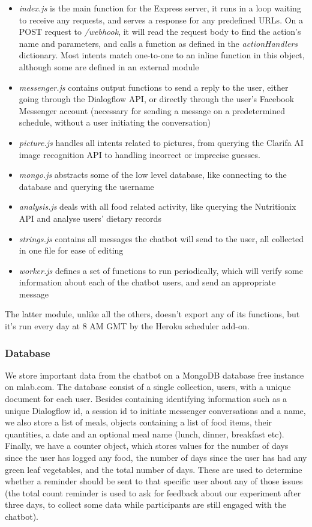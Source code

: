 \begin{itemize}
  \item \textit{index.js} is the main function for the Express server, it runs in a loop waiting to receive any requests, and serves a response for any predefined URLs. On a POST request to \textit{/webhook}, it will read the request body to find the action's name and parameters, and calls a function as defined in the \textit{actionHandlers} dictionary. Most intents match one-to-one to an inline function in this object, although some are defined in an external module
  \item \textit{messenger.js} contains output functions to send a reply to the user, either going through the Dialogflow API, or directly through the user's Facebook Messenger account (necessary for sending a message on a predetermined schedule, without a user initiating the conversation)
  \item \textit{picture.js} handles all intents related to pictures, from querying the Clarifa AI image recognition API to handling incorrect or imprecise guesses.
  \item \textit{mongo.js} abstracts some of the low level database, like connecting to the database and querying the username
  \item \textit{analysis.js} deals with all food related activity, like querying the Nutritionix API and analyse users' dietary records
  \item \textit{strings.js} contains all messages the chatbot will send to the user, all collected in one file for ease of editing
  \item \textit{worker.js} defines a set of functions to run periodically, which will verify some information about each of the chatbot users, and send an appropriate message
\end{itemize}
The latter module, unlike all the others, doesn't export any of its functions, but it's run every day at 8 AM GMT by the Heroku scheduler add-on.
\subsubsection{Database}
We store important data from the chatbot on a MongoDB database free instance on mlab.com. The database consist of a single collection, users, with a unique document for each user. Besides containing identifying information such as a unique Dialogflow id, a session id to initiate messenger conversations and a name, we also store a list of meals, objects containing a list of food items, their quantities, a date and an optional meal name (lunch, dinner, breakfast etc). Finally, we have a counter object, which stores values for the number of days since the user has logged any food, the number of days since the user has had any green leaf vegetables, and the total number of days. These are used to determine whether a reminder should be sent to that specific user about any of those issues (the total count reminder is used to ask for feedback about our experiment after three days, to collect some data while participants are still engaged with the chatbot).

